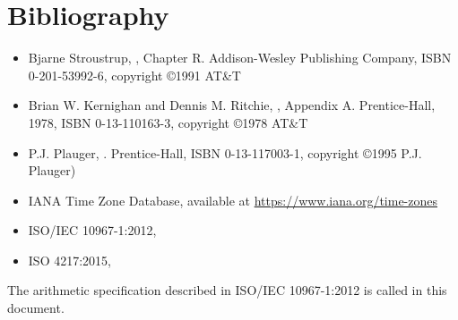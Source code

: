 
\chapter{Bibliography}

\begin{itemize}
\renewcommand{\labelitemi}{---}
\item
  Bjarne Stroustrup,
  , Chapter R.
  Addison-Wesley Publishing Company, ISBN 0-201-53992-6, copyright \copyright 1991 AT\&T
\item
  Brian W. Kernighan and Dennis M. Ritchie,
  , Appendix A.
  Prentice-Hall, 1978, ISBN 0-13-110163-3, copyright \copyright 1978 AT\&T
\item
  P.J. Plauger,
  .
  Prentice-Hall, ISBN 0-13-117003-1, copyright \copyright 1995 P.J. Plauger)
\item
  IANA Time Zone Database,
  available at \url{https://www.iana.org/time-zones}
\item
  ISO/IEC 10967-1:2012,
\item
  ISO 4217:2015,
\end{itemize}

The arithmetic specification described in ISO/IEC 10967-1:2012 is
called  in this document.

\let\realglossitem\glossitem
\renewcommand{\glossitem}[4]{\hangpara{4em}{1}\realglossitem{#1}{#2}{#3}{#4}}

\clearpage
\renewcommand{\glossaryname}{Cross references}
\renewcommand{\preglossaryhook}{This annex lists each clause or subclause label and the
corresponding clause or subclause number and page number, in alphabetical order by label.\\}
\twocolglossary
\renewcommand{\leftmark}{\glossaryname}
{
\raggedright
\printglossary[xrefindex]
}

\clearpage

\renewcommand{\glossaryname}{Cross references from ISO \CppXVII{}}
\renewcommand{\preglossaryhook}{All clause and subclause labels from
ISO \CppXVII{} (ISO/IEC 14882:2017, \doccite{Programming Languages --- \Cpp{}})
are present in this document, with the exceptions described below.\\}
\renewcommand{\leftmark}{\glossaryname}
{
\raggedright
\printglossary[xrefdelta]
}

